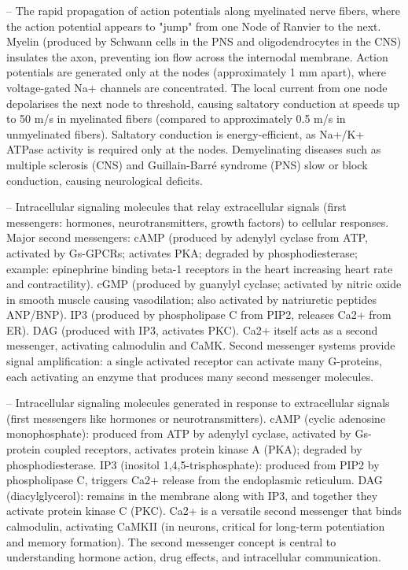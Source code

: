 -- The rapid propagation of action potentials along myelinated nerve fibers, where the action potential appears to "jump" from one Node of Ranvier to the next. Myelin (produced by Schwann cells in the PNS and oligodendrocytes in the CNS) insulates the axon, preventing ion flow across the internodal membrane. Action potentials are generated only at the nodes (approximately 1 mm apart), where voltage-gated Na+ channels are concentrated. The local current from one node depolarises the next node to threshold, causing saltatory conduction at speeds up to 50 m/s in myelinated fibers (compared to approximately 0.5 m/s in unmyelinated fibers). Saltatory conduction is energy-efficient, as Na+/K+ ATPase activity is required only at the nodes. Demyelinating diseases such as multiple sclerosis (CNS) and Guillain-Barré syndrome (PNS) slow or block conduction, causing neurological deficits.

-- Intracellular signaling molecules that relay extracellular signals (first messengers: hormones, neurotransmitters, growth factors) to cellular responses. Major second messengers: cAMP (produced by adenylyl cyclase from ATP, activated by Gs-GPCRs; activates PKA; degraded by phosphodiesterase; example: epinephrine binding beta-1 receptors in the heart increasing heart rate and contractility). cGMP (produced by guanylyl cyclase; activated by nitric oxide in smooth muscle causing vasodilation; also activated by natriuretic peptides ANP/BNP). IP3 (produced by phospholipase C from PIP2, releases Ca2+ from ER). DAG (produced with IP3, activates PKC). Ca2+ itself acts as a second messenger, activating calmodulin and CaMK. Second messenger systems provide signal amplification: a single activated receptor can activate many G-proteins, each activating an enzyme that produces many second messenger molecules.

-- Intracellular signaling molecules generated in response to extracellular signals (first messengers like hormones or neurotransmitters). cAMP (cyclic adenosine monophosphate): produced from ATP by adenylyl cyclase, activated by Gs-protein coupled receptors, activates protein kinase A (PKA); degraded by phosphodiesterase. IP3 (inositol 1,4,5-trisphosphate): produced from PIP2 by phospholipase C, triggers Ca2+ release from the endoplasmic reticulum. DAG (diacylglycerol): remains in the membrane along with IP3, and together they activate protein kinase C (PKC). Ca2+ is a versatile second messenger that binds calmodulin, activating CaMKII (in neurons, critical for long-term potentiation and memory formation). The second messenger concept is central to understanding hormone action, drug effects, and intracellular communication.

